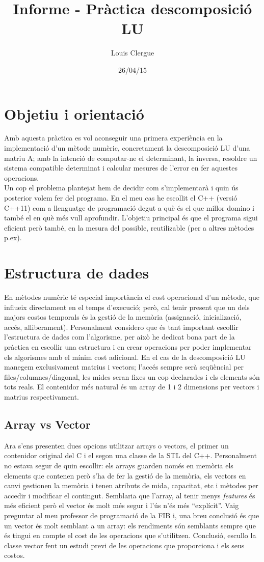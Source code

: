 \documentclass[a4paper,10pt]{article}
\title{Informe - Pràctica descomposició LU}
\author{Louis Clergue}
\date{26/04/15}
\begin{document}
\maketitle

\section{Objetiu i orientació}
Amb aquesta pràctica es vol aconseguir una primera experiència en la implementació d'un mètode numèric, concretament la descomposició LU d'una matriu A;
amb la intenció de computar-ne el determinant, la inversa, resoldre un sistema compatible determinat i calcular mesures de l'error en fer aquestes
operacions.
\\
Un cop el problema plantejat hem de decidir com s'implementarà i quin ús posterior volem fer del programa.
En el meu cas he escollit el C++ (versió C++11) com a llenguatge de programació degut a què és el que millor domino i també el en què més vull aprofundir.
L'objetiu principal és que el programa sigui eficient però també, en la mesura del possible, reutilizable (per a altres mètodes p.ex).
\section{Estructura de dades}
En mètodes numèric té especial importància el cost operacional d'un mètode, que influeix directament en el temps d'execució; però, cal tenir present que un dels
majors costos temporals és la gestió de la memòria (assignació, inicializació, accés, alliberament). Personalment considero que és tant important escollir
l'estructura de dades com l'algorisme, per això he dedicat bona part de la pràctica en escollir una estructura i en crear operacions per poder implementar els
algorismes amb el mínim cost adicional.
En el cas de la descomposició LU manegem exclusivament matrius i vectors; l'accés sempre serà seqüèncial per files/columnes/diagonal, les mides seran fixes
un cop declarades i els elements són tots reals.
El contenidor més natural és un array de 1 i 2 dimensions per vectors i matrius respectivament.
\subsection{Array vs Vector}
Ara s'ens presenten dues opcions utilitzar arrays o vectors, el primer un contenidor original del C i el segon una classe de la STL del C++.
Personalment no estava segur de quin escollir: els arrays guarden només en memòria els elements que contenen però s'ha de fer la gestió de la memòria,
els vectors en canvi gestionen la memòria i tenen atributs de mida, capacitat, etc i mètodes per accedir i modificar el contingut. Semblaria que l'array,
al tenir menys \textit{features} és més eficient però el vector és molt més segur i l'ús n'és més ``explícit''. Vaig preguntar al meu professor de programació de
la FIB i, una breu conclusió és que un vector és molt semblant a un array: els rendiments són semblants sempre que és tingui en compte el cost de les
operacions que s'utilitzen. Conclusió, escullo la classe vector fent un estudi previ de les operacions que proporciona i els seus costos.
\end{document}
